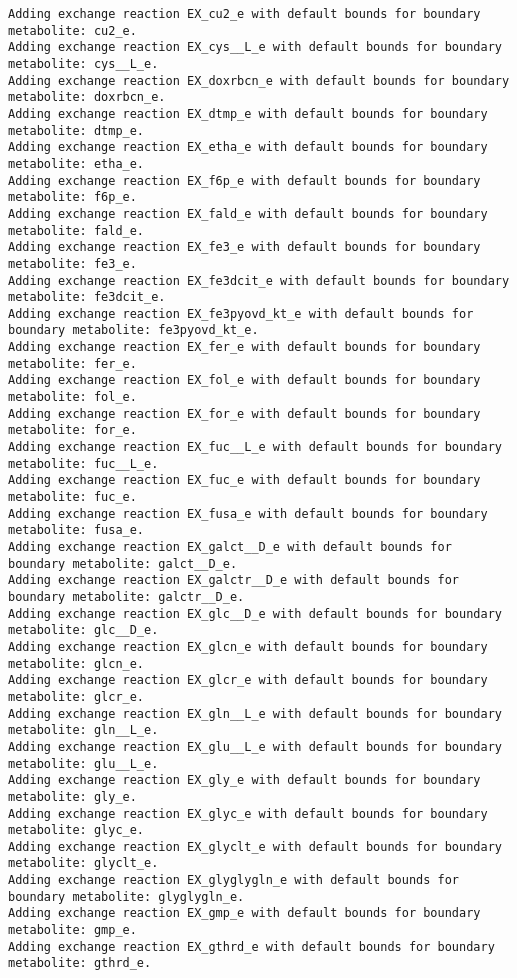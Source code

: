 \documentclass[
  letterpaper,
  DIV=11,
  numbers=noendperiod]{scrartcl}
\begin{document}
\begin{verbatim}
Adding exchange reaction EX_cu2_e with default bounds for boundary metabolite: cu2_e.
Adding exchange reaction EX_cys__L_e with default bounds for boundary metabolite: cys__L_e.
Adding exchange reaction EX_doxrbcn_e with default bounds for boundary metabolite: doxrbcn_e.
Adding exchange reaction EX_dtmp_e with default bounds for boundary metabolite: dtmp_e.
Adding exchange reaction EX_etha_e with default bounds for boundary metabolite: etha_e.
Adding exchange reaction EX_f6p_e with default bounds for boundary metabolite: f6p_e.
Adding exchange reaction EX_fald_e with default bounds for boundary metabolite: fald_e.
Adding exchange reaction EX_fe3_e with default bounds for boundary metabolite: fe3_e.
Adding exchange reaction EX_fe3dcit_e with default bounds for boundary metabolite: fe3dcit_e.
Adding exchange reaction EX_fe3pyovd_kt_e with default bounds for boundary metabolite: fe3pyovd_kt_e.
Adding exchange reaction EX_fer_e with default bounds for boundary metabolite: fer_e.
Adding exchange reaction EX_fol_e with default bounds for boundary metabolite: fol_e.
Adding exchange reaction EX_for_e with default bounds for boundary metabolite: for_e.
Adding exchange reaction EX_fuc__L_e with default bounds for boundary metabolite: fuc__L_e.
Adding exchange reaction EX_fuc_e with default bounds for boundary metabolite: fuc_e.
Adding exchange reaction EX_fusa_e with default bounds for boundary metabolite: fusa_e.
Adding exchange reaction EX_galct__D_e with default bounds for boundary metabolite: galct__D_e.
Adding exchange reaction EX_galctr__D_e with default bounds for boundary metabolite: galctr__D_e.
Adding exchange reaction EX_glc__D_e with default bounds for boundary metabolite: glc__D_e.
Adding exchange reaction EX_glcn_e with default bounds for boundary metabolite: glcn_e.
Adding exchange reaction EX_glcr_e with default bounds for boundary metabolite: glcr_e.
Adding exchange reaction EX_gln__L_e with default bounds for boundary metabolite: gln__L_e.
Adding exchange reaction EX_glu__L_e with default bounds for boundary metabolite: glu__L_e.
Adding exchange reaction EX_gly_e with default bounds for boundary metabolite: gly_e.
Adding exchange reaction EX_glyc_e with default bounds for boundary metabolite: glyc_e.
Adding exchange reaction EX_glyclt_e with default bounds for boundary metabolite: glyclt_e.
Adding exchange reaction EX_glyglygln_e with default bounds for boundary metabolite: glyglygln_e.
Adding exchange reaction EX_gmp_e with default bounds for boundary metabolite: gmp_e.
Adding exchange reaction EX_gthrd_e with default bounds for boundary metabolite: gthrd_e.

\end{verbatim}
\end{document}
